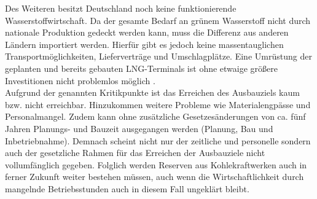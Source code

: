 		Des Weiteren besitzt Deutschland noch keine funktionierende Wasserstoffwirtschaft. 
		Da der gesamte Bedarf an grünem Wasserstoff nicht durch nationale Produktion gedeckt werden kann, muss die Differenz aus anderen Ländern importiert werden.
		Hierfür gibt es jedoch keine massentauglichen Transportmöglichkeiten, Lieferverträge und Umschlagplätze.
		Eine Umrüstung der geplanten und bereits gebauten LNG-Terminals ist ohne etwaige größere Investitionen nicht problemlos möglich \cite{Frauenhofer_LNG}. \\
		
		Aufgrund der genannten Kritikpunkte ist das Erreichen des Ausbauziels kaum bzw. nicht erreichbar. Hinzukommen weitere Probleme wie Materialengpässe und Personalmangel.
		Zudem kann ohne zusätzliche Gesetzesänderungen von ca. fünf Jahren Planungs- und Bauzeit ausgegangen werden (Planung, Bau und Inbetriebnahme).
		Demnach scheint nicht nur der zeitliche und personelle sondern auch der gesetzliche Rahmen für das Erreichen der Ausbauziele nicht vollumfänglich gegeben.
		Folglich werden Reserven aus Kohlekraftwerken auch in ferner Zukunft weiter bestehen müssen, auch wenn die Wirtschaftlichkeit durch mangelnde Betriebsstunden auch in diesem Fall ungeklärt bleibt.
			
		
		